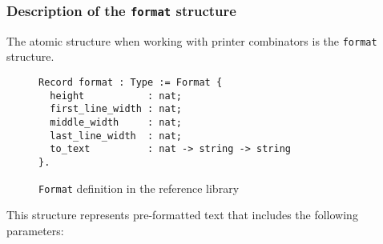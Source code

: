 \documentclass[14pt]{constructor-diploma}
\begin{document}

\subsubsection{Description of the \texttt{format} structure}
The atomic structure when working with printer combinators is the \texttt{format} structure. 
\begin{figure}[H]

\begin{mdframed}[backgroundcolor=bg]
\begin{verbatim}
Record format : Type := Format {
  height           : nat;
  first_line_width : nat;
  middle_width     : nat;
  last_line_width  : nat;
  to_text          : nat -> string -> string
}.
\end{verbatim}
\end{mdframed}
\caption{\texttt{Format} definition in the reference library~\cite{korolihin}}
\label{fig:format}
\end{figure}
This structure represents pre-formatted text that includes the following parameters:
\end{document}
